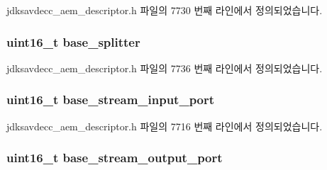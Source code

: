 jdksavdecc\+\_\+aem\+\_\+descriptor.\+h 파일의 7730 번째 라인에서 정의되었습니다.

\subsubsection[{\texorpdfstring{base\+\_\+splitter}{base_splitter}}]{\setlength{\rightskip}{0pt plus 5cm}uint16\+\_\+t base\+\_\+splitter}\hypertarget{structjdksavdecc__descriptor__audio__unit_a7a10a93a209406b90273d791f69a4421}{}\label{structjdksavdecc__descriptor__audio__unit_a7a10a93a209406b90273d791f69a4421}


jdksavdecc\+\_\+aem\+\_\+descriptor.\+h 파일의 7736 번째 라인에서 정의되었습니다.

\subsubsection[{\texorpdfstring{base\+\_\+stream\+\_\+input\+\_\+port}{base_stream_input_port}}]{\setlength{\rightskip}{0pt plus 5cm}uint16\+\_\+t base\+\_\+stream\+\_\+input\+\_\+port}\hypertarget{structjdksavdecc__descriptor__audio__unit_a8ad4ba35aee3ad22d5e946438bbaba53}{}\label{structjdksavdecc__descriptor__audio__unit_a8ad4ba35aee3ad22d5e946438bbaba53}


jdksavdecc\+\_\+aem\+\_\+descriptor.\+h 파일의 7716 번째 라인에서 정의되었습니다.

\subsubsection[{\texorpdfstring{base\+\_\+stream\+\_\+output\+\_\+port}{base_stream_output_port}}]{\setlength{\rightskip}{0pt plus 5cm}uint16\+\_\+t base\+\_\+stream\+\_\+output\+\_\+port}\hypertarget{structjdksavdecc__descriptor__audio__unit_a234b990d7bb2f22da0ba4bebadc71a70}{}\label{structjdksavdecc__descriptor__audio__unit_a234b990d7bb2f22da0ba4bebadc71a70}



